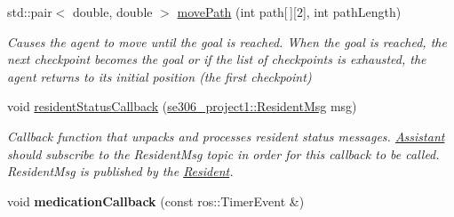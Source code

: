 \begin{DoxyCompactItemize}
\item 
std\-::pair$<$ double, double $>$ \hyperlink{classDoctor_a958cbab204ba7da1aeb34c33e028dc14}{move\-Path} (int path\mbox{[}$\,$\mbox{]}\mbox{[}2\mbox{]}, int path\-Length)
\begin{DoxyCompactList}\small\item\em Causes the agent to move until the goal is reached. When the goal is reached, the next checkpoint becomes the goal or if the list of checkpoints is exhausted, the agent returns to its initial position (the first checkpoint) \end{DoxyCompactList}\item 
void \hyperlink{classDoctor_af4d24247a3f59b1b3b5258938e019086}{resident\-Status\-Callback} (\hyperlink{structse306__project1_1_1ResidentMsg__}{se306\-\_\-project1\-::\-Resident\-Msg} msg)
\begin{DoxyCompactList}\small\item\em Callback function that unpacks and processes resident status messages. \hyperlink{classAssistant}{Assistant} should subscribe to the Resident\-Msg topic in order for this callback to be called. Resident\-Msg is published by the \hyperlink{classResident}{Resident}. \end{DoxyCompactList}\item 
\hypertarget{classDoctor_a26ae14986239ea67147a52235685e31e}{void {\bfseries medication\-Callback} (const ros\-::\-Timer\-Event \&)}\label{classDoctor_a26ae14986239ea67147a52235685e31e}

\end{DoxyCompactItemize}
